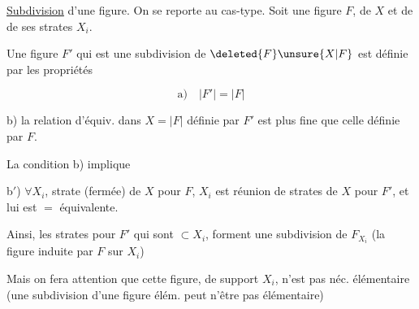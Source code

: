\uline{Subdivision} d'une figure.  On se reporte au cas-type. Soit une figure $F$,  de $X$ et de  de ses strates $X_i$.

Une  figure $F'$ qui est une subdivision de $\deleted{F}\unsure{X|F}$ est  définie par les propriétés

\[
\text{a)}\quad |F'|=|F|
\]

b) la relation d'équiv. dans $X=|F|$ définie par $F'$ est plus fine que celle définie par  $F$.

La condition b) implique

b$'$) $\forall X_i$, strate (fermée) de $X$ pour $F$, $X_i$ est réunion de strates de $X$ pour $F'$,  et  lui est $=$ équivalente.

Ainsi, les strates pour $F'$ qui sont $\subset X_i$, forment une  subdivision de $F_{X_i}$ (la figure  induite par $F$ sur $X_i$)

Mais on fera attention que cette figure, de support $X_i$, n'est pas néc. élémentaire (une subdivision d'une figure élém. peut n'être pas élémentaire)
